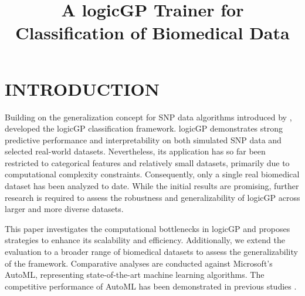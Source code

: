 \documentclass[a4paper,twoside]{article}
\begin{document}
\title{A logicGP Trainer for Classification of Biomedical Data}


\author{ }




\onecolumn \maketitle \normalsize \setcounter{footnote}{0} \vfill

\section{\uppercase{Introduction}}
Building on the generalization concept for SNP data algorithms introduced by \citet{bioinformatics25}, \citet{10.1145/3712255.3734300} developed the logicGP classification framework. logicGP demonstrates strong predictive performance and interpretability on both simulated SNP data and selected real-world datasets. Nevertheless, its application has so far been restricted to categorical features and relatively small datasets, primarily due to computational complexity constraints. Consequently, only a single real biomedical dataset has been analyzed to date. While the initial results are promising, further research is required to assess the robustness and generalizability of logicGP across larger and more diverse datasets.

This paper investigates the computational bottlenecks in logicGP and proposes strategies to enhance its scalability and efficiency. Additionally, we extend the evaluation to a broader range of biomedical datasets to assess the generalizability of the framework. Comparative analyses are conducted against Microsoft's AutoML, representing state-of-the-art machine learning algorithms. The competitive performance of AutoML has been demonstrated in previous studies \citep{NunkesserExplains}.
\end{document}
